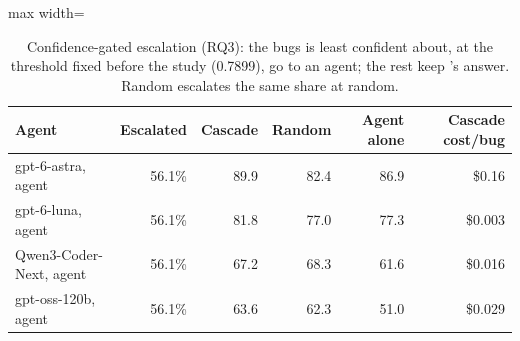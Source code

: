 \begin{table}[t]
\centering
\small
\caption{Confidence-gated escalation (RQ3): the bugs \tool{} is least confident about, at the threshold fixed before the study (0.7899), go to an agent; the rest keep \tool{}'s answer. Random escalates the same share at random.}
\label{tab:escalation}
\begin{adjustbox}{max width=\linewidth}\begin{tabular}{lrrrrr}
\toprule
Agent & Escalated & Cascade & Random & Agent alone & Cascade cost/bug \\
\midrule
gpt-6-astra, agent & 56.1\% & 89.9 & 82.4 & 86.9 & \$0.16 \\
gpt-6-luna, agent & 56.1\% & 81.8 & 77.0 & 77.3 & \$0.003 \\
Qwen3-Coder-Next, agent & 56.1\% & 67.2 & 68.3 & 61.6 & \$0.016 \\
gpt-oss-120b, agent & 56.1\% & 63.6 & 62.3 & 51.0 & \$0.029 \\
\bottomrule
\end{tabular}\end{adjustbox}
\end{table}
